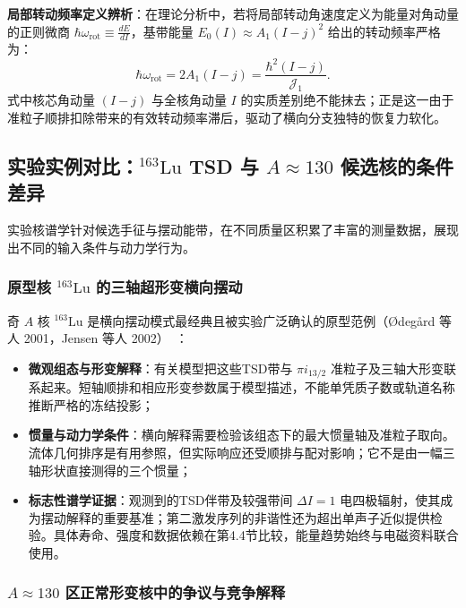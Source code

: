 \textbf{局部转动频率定义辨析}：在理论分析中，若将局部转动角速度定义为能量对角动量的正则微商 $\hbar \omega_{\text{rot}} \equiv \frac{dE}{dI}$，基带能量 $E_0(I) \approx A_1(I - j)^2$ 给出的转动频率严格为：
\begin{equation}\label{eq:3-3-rot-freq-diff}
\hbar \omega_{\text{rot}} = 2 A_1 (I - j) = \frac{\hbar^2 (I - j)}{\mathcal{J}_1}.
\end{equation}
式中核芯角动量 $(I - j)$ 与全核角动量 $I$ 的实质差别绝不能抹去；正是这一由于准粒子顺排扣除带来的有效转动频率滞后，驱动了横向分支独特的恢复力软化。

\subsection{实验实例对比：$^{163}\mathrm{Lu}$ TSD 与 $A\approx 130$ 候选核的条件差异}\label{sec:3-3-4}

实验核谱学针对候选手征与摆动能带，在不同质量区积累了丰富的测量数据，展现出不同的输入条件与动力学行为。

\subsubsection{原型核 $^{163}\mathrm{Lu}$ 的三轴超形变横向摆动}

奇 $A$ 核 $^{163}\mathrm{Lu}$ 是横向摆动模式最经典且被实验广泛确认的原型范例（{\O}deg{\aa}rd 等人 2001，Jensen 等人 2002）~\cite{odegard-2001-evidence-wobbling-163lu,jensen-2002-second-phonon-wobbling-163lu}：
\begin{itemize}
\item \textbf{微观组态与形变解释}：有关模型把这些TSD带与 $\pi i_{13/2}$ 准粒子及三轴大形变联系起来。短轴顺排和相应形变参数属于模型描述，不能单凭质子数或轨道名称推断严格的冻结投影；
\item \textbf{惯量与动力学条件}：横向解释需要检验该组态下的最大惯量轴及准粒子取向。流体几何排序是有用参照，但实际响应还受顺排与配对影响；它不是由一幅三轴形状直接测得的三个惯量；
\item \textbf{标志性谱学证据}：观测到的TSD伴带及较强带间 $\Delta I=1$ 电四极辐射，使其成为摆动解释的重要基准；第二激发序列的非谐性还为超出单声子近似提供检验。具体寿命、强度和数据依赖在第4.4节比较，能量趋势始终与电磁资料联合使用。~\cite{odegard-2001-evidence-wobbling-163lu,jensen-2002-second-phonon-wobbling-163lu}
\end{itemize}

\subsubsection{$A \approx 130$ 区正常形变核中的争议与竞争解释}

